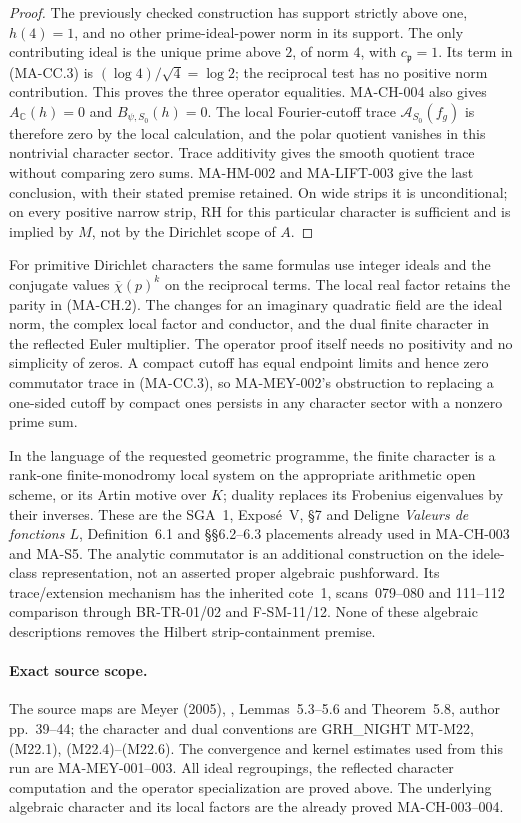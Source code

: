 \begin{proof}
The previously checked construction has support strictly above
one, $h(4)=1$, and no other prime-ideal-power norm in its support.
The only contributing ideal is the unique prime above $2$,
of norm $4$, with $c_{\mathfrak p}=1$.
Its term in (MA-CC.3) is
$(\log4)/\sqrt4=\log2$; the reciprocal test has no positive
norm contribution.  This proves the three operator equalities.
MA-CH-004 also gives $A_{\mathbb C}(h)=0$ and $B_{\psi,S_0}(h)=0$.
The local Fourier-cutoff trace $\mathcal A_{S_0}(f_g)$ is
therefore zero by the local calculation, and the polar quotient
vanishes in this nontrivial character sector.  Trace additivity
gives the smooth quotient trace without comparing zero sums.
MA-HM-002 and MA-LIFT-003 give the last conclusion, with their
stated premise retained.  On wide strips it is unconditional;
on every positive narrow strip, RH for this particular character
is sufficient and is implied by $M$, not by the Dirichlet scope
of $A$.
\end{proof}

For primitive Dirichlet characters the same formulas use integer
ideals and the conjugate values $\overline\chi(p)^k$ on the
reciprocal terms.  The local real factor retains the parity in
(MA-CH.2).  The changes for an imaginary quadratic field are the
ideal norm, the complex local factor and conductor, and the dual
finite character in the reflected Euler multiplier.  The
operator proof itself needs no positivity and no simplicity of
zeros.  A compact cutoff has equal endpoint limits and hence
zero commutator trace in (MA-CC.3), so MA-MEY-002's obstruction
to replacing a one-sided cutoff by compact ones persists in
any character sector with a nonzero prime sum.

In the language of the requested geometric programme, the finite
character is a rank-one finite-monodromy local system on the
appropriate arithmetic open scheme, or its Artin motive over
$K$; duality replaces its Frobenius eigenvalues by their inverses.
These are the SGA~1, Expos\'e~V, \S7 and Deligne
\emph{Valeurs de fonctions $L$}, Definition~6.1 and
\S\S6.2--6.3 placements already used in MA-CH-003 and MA-S5.
The analytic commutator is an additional construction on the
idele-class representation, not an asserted proper algebraic
pushforward.  Its trace/extension mechanism has the inherited
cote~1, scans~079--080 and 111--112 comparison through
BR-TR-01/02 and F-SM-11/12.  None of these algebraic descriptions
removes the Hilbert strip-containment premise.

\paragraph{Exact source scope.}
The source maps are Meyer (2005), ,
Lemmas~5.3--5.6 and Theorem~5.8, author pp.~39--44; the
character and dual conventions are GRH\_NIGHT MT-M22,
(M22.1), (M22.4)--(M22.6).  The convergence and kernel estimates
used from this run are MA-MEY-001--003.  All ideal regroupings,
the reflected character computation and the operator specialization
are proved above.  The underlying algebraic character and its
local factors are the already proved MA-CH-003--004.
